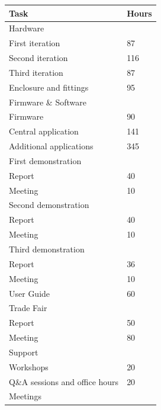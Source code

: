 \documentclass{article}
\begin{document}
\begin{table}[]
\begin{center}
\begin{small}
\begin{tabular}{|l|l|}
\hline
\rowcolor[HTML]{C0C0C0} 
Task                           & Hours \\ \hline
Hardware                       &       \\
\quad First iteration                & 87    \\
\quad Second iteration               & 116   \\
\quad Third iteration                & 87    \\
\quad Enclosure and fittings         & 95    \\ \hline
Firmware \& Software           &       \\
\quad Firmware                       & 90    \\
\quad Central application            & 141   \\
\quad Additional applications        & 345   \\ \hline
First demonstration            &       \\
\quad Report                         & 40    \\
\quad Meeting                        & 10    \\ \hline
Second demonstration           &       \\
\quad Report                         & 40    \\
\quad Meeting                        & 10    \\ \hline
Third demonstration            &       \\
\quad Report                         & 36    \\
\quad Meeting                        & 10    \\
\quad User Guide                     & 60    \\ \hline
Trade Fair                     &       \\
\quad Report                         & 50    \\
\quad Meeting                        & 80    \\ \hline
Support                        &       \\
\quad Workshops                      & 20    \\
\quad Q\&A sessions and office hours & 20    \\ \hline
Meetings                       &       \\

\end{tabular}
\end{small}
\end{center}
\end{table}
\end{document}
